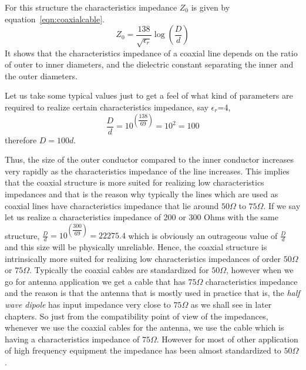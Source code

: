 For this structure the characteristics impedance $Z_0$ is given by equation~\eqref{eqn:coaxialcable}.
\begin{equation}
Z_0 =\frac{138}{\sqrt{\epsilon_r}}\log(\dfrac{D}{d})
\label{eqn:coaxialcable}
\end{equation}
It shows that the characteristics impedance of a coaxial line depends on the ratio of outer to inner diameters, and the dielectric constant separating the inner and the outer diameters.

Let us take some typical values just to get a feel of what kind of parameters are required to realize certain characteristics impedance, say $\epsilon_r$=4, 
\begin{dmath*}
\dfrac{D}{d}=10^{(\dfrac{138}{69})}=10^{2}=100
\end{dmath*}
therefore $D=100d$.

Thus, the size of the outer conductor compared to the inner conductor increases very rapidly as the characteristics impedance of the line increases. This implies that the coaxial structure is more suited for realizing low characteristics impedances and that is the reason why typically the lines which are used as coaxial lines have characteristics impedance that lie around $50\varOmega$ to $75\varOmega$. If we say let us realize a characteristics impedance of 200 or 300 Ohms with the same structure, $\frac{D}{d} = 10^{\left(\dfrac{300}{69}\right)} = 22275.4$ which is obviously an outrageous value of $\frac{D}{d}$ and this size will be physically unreliable. Hence, the coaxial structure is intrinsically more suited for realizing low characteristics impedances of order $50\varOmega$ or $75\varOmega$. Typically the coaxial cables are standardized for $50\varOmega$, however when we go for antenna application we get a cable that has $75\varOmega$ characteristics impedance and the reason is that the antenna that is mostly used in practice that is, the \emph{half wave dipole} has input impedance very close to $75\varOmega$ as we shall see in later chapters. So just from the compatibility point of view of the impedances, whenever we use the coaxial cables for the antenna, we use the cable which is having a characteristics impedance of $75\varOmega$. However for most of other application of high frequency equipment the impedance has been almost standardized to $50\varOmega$.

